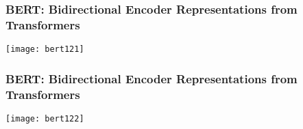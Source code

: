 \begin{frame}[fragile]\frametitle{BERT: Bidirectional Encoder Representations from Transformers}

			\begin{center}
			\texttt{[image: bert121]}
			\end{center}		
			

\end{frame}

\begin{frame}[fragile]\frametitle{BERT: Bidirectional Encoder Representations from Transformers}

			\begin{center}
			\texttt{[image: bert122]}
			\end{center}		
			

\end{frame}

